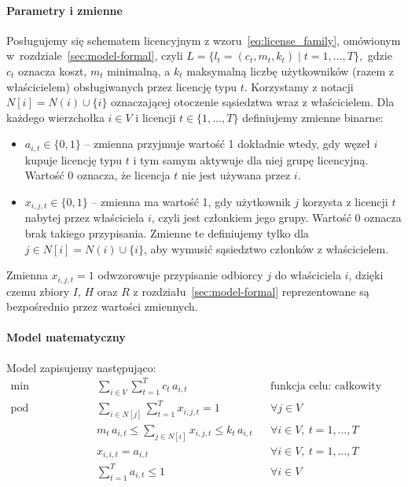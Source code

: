 \paragraph{Parametry i zmienne}
Posługujemy się schematem licencyjnym z wzoru~\eqref{eq:license_family}, omówionym w~rozdziale~\ref{sec:model-formal}, czyli
\(
  L = \{ l_t = (c_t, m_t, k_t) \mid t = 1,\dots,T \},
\)
gdzie \(c_t\) oznacza koszt, \(m_t\) minimalną, a \(k_t\) maksymalną liczbę użytkowników (razem z właścicielem) obsługiwanych przez licencję typu \(t\). Korzystamy z notacji \(N[i]=N(i)\cup\{i\}\) oznaczającej otoczenie sąsiedztwa wraz z właścicielem. Dla każdego wierzchołka \(i\in V\) i licencji \(t\in\{1,\dots,T\}\) definiujemy zmienne binarne:
\begin{itemize}
  \item \(a_{i,t}\in\{0,1\}\) -- zmienna przyjmuje wartość 1 dokładnie wtedy, gdy węzeł \(i\) kupuje licencję typu \(t\) i tym samym aktywuje dla niej grupę licencyjną. Wartość 0 oznacza, że licencja \(t\) nie jest używana przez \(i\).
  \item \(x_{i,j,t}\in\{0,1\}\) -- zmienna ma wartość 1, gdy użytkownik \(j\) korzysta z licencji \(t\) nabytej przez właściciela \(i\), czyli jest członkiem jego grupy. Wartość 0 oznacza brak takiego przypisania. Zmienne te definiujemy tylko dla \(j\in N[i]=N(i)\cup\{i\}\), aby wymusić sąsiedztwo członków z właścicielem.
\end{itemize}
Zmienna \(x_{i,j,t}=1\) odwzorowuje przypisanie odbiorcy \(j\) do właściciela \(i\), dzięki czemu zbiory \(I\), \(H\) oraz \(R\) z rozdziału~\ref{sec:model-formal} reprezentowane są bezpośrednio przez wartości zmiennych.

\paragraph{Model matematyczny}
Model zapisujemy następująco:
\begin{align}
  \min\quad & \sum_{i\in V}\sum_{t=1}^{T} c_t\, a_{i,t}                    
            &  & \text{funkcja celu: całkowity koszt licencji} \\[6pt]
  \text{pod warunkami:}\quad
            & \sum_{i\in N[j]}\sum_{t=1}^{T} x_{i,j,t} = 1                   
            &  & \forall j\in V \label{con:cover} \\[6pt]
            & m_t\, a_{i,t} \le \sum_{j\in N[i]} x_{i,j,t} \le k_t\, a_{i,t} 
            &  & \forall i\in V,\ t=1,\dots,T \label{con:capacity} \\[6pt]
            & x_{i,i,t} = a_{i,t}                                              
            &  & \forall i\in V,\ t=1,\dots,T \label{con:owner} \\[6pt]
            & \sum_{t=1}^{T} a_{i,t} \le 1                                     
            &  & \forall i\in V \label{con:one}
\end{align}

